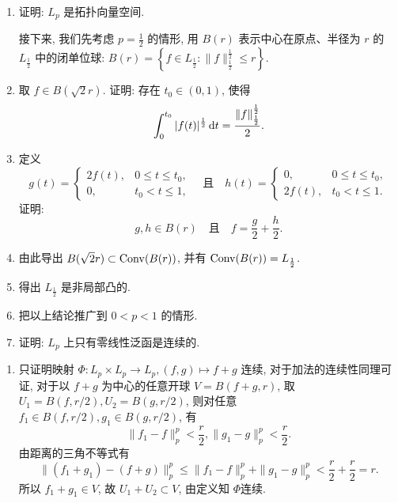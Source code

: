 \begin{enumerate}
    \begin{enumerate}
      \item 证明: $L_p$ 是拓扑向量空间.

      接下来, 我们先考虑 $p=\frac{1}{2}$ 的情形, 用 $B(r)$ 表示中心在原点、半径为 $r$ 的 $L_{\frac{1}{2}}$ 中的闭单位球: 
      $B(r)=\left\{f \in L_{\frac{1}{2}}\colon \|f\|_{\frac{1}{2}}^{\frac{1}{2}} \leqslant r\right\}$.
  
      \item 取 $f\in B(\sqrt{2}r)$. 证明: 存在 $t_0 \in(0,1)$, 使得
      \[
      \int_{0}^{t_0}|f(t)|^{\frac{1}{2}}\mathop{}\!\mathrm{d} t=\frac{\|f\|_{\frac{1}{2}}^{\frac{1}{2}}}{2}.
      \]
  
      \item 定义
      \[g(t)=
      \begin{cases}
          2f(t), & 0\leqslant t\leqslant t_{0}, \\
          0, & t_{0}<t\leqslant 1,
      \end{cases}\quad\text{且}\quad 
      h(t)=\begin{cases}
          0, & 0 \leqslant t \leqslant t_{0}, \\
          2f(t), & t_{0}<t \leqslant 1.
      \end{cases}\]
      证明:
      \[g, h \in B(r) \quad \text{且} \quad f=\frac{g}{2}+\frac{h}{2}.\]
  
      \item 由此导出 $B(\sqrt{2} r)\subset\operatorname{Conv}(B(r))$, 并有 $\operatorname{Conv}(B(r))=L_{\frac{1}{2}}$.
  
      \item 得出 $L_{\frac{1}{2}}$ 是非局部凸的.
  
      \item 把以上结论推广到 $0<p<1$ 的情形.
  
      \item 证明: $L_{p}$ 上只有零线性泛函是连续的.
    \end{enumerate}
    \begin{answer}
      \begin{enumerate}
        \item 只证明映射 $\varPhi:L_p\times L_p\to L_p,(f,g)\mapsto f+g$ 连续,
        对于加法的连续性同理可证, 对于以 $f+g$ 为中心的任意开球 $V=B(f+g,r)$,
        取 $U_1=B(f,r/2),U_2=B(g,r/2)$, 则对任意 $f_1\in B(f,r/2),g_1\in B(g,r/2)$, 有
        \[\|f_1-f\|_p^p<\frac{r}{2},\|g_1-g\|_p^p<\frac{r}{2}.\]
        由距离的三角不等式有
        \[\|(f_1+g_1)-(f+g)\|_p^p\leq\|f_1-f\|_p^p+\|g_1-g\|_p^p<\frac{r}{2}+\frac{r}{2}=r.\]
        所以 $f_1+g_1\in V$, 故 $U_1+U_2\subset V$, 由定义知 $\varPhi$连续.
    

\end{enumerate}
\end{answer}
\end{enumerate}

